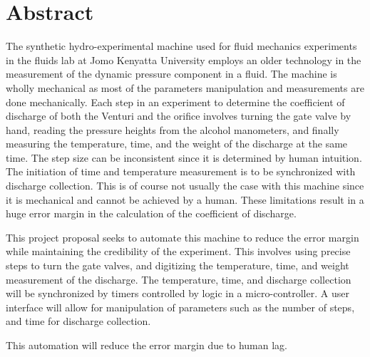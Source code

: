 \section*{Abstract}
\label{sec:}
The synthetic hydro-experimental machine used for fluid mechanics experiments in the fluids lab at Jomo Kenyatta University employs an older technology in the measurement of the dynamic pressure component in a fluid. The machine is wholly mechanical as most of the parameters manipulation and measurements are done mechanically. Each step in an experiment to determine the coefficient of discharge of both the Venturi and the orifice involves turning the gate valve by hand, reading the pressure heights from the alcohol manometers, and finally measuring the temperature, time, and the weight of the discharge at the same time. The step size can be inconsistent since it is determined by human intuition. The initiation of time and temperature measurement is to be synchronized with discharge collection. This is of course not usually the case with this machine since it is mechanical and cannot be achieved by a human. These limitations result in a huge error margin in the calculation of the coefficient of discharge.
\par
This project proposal seeks to automate this machine to reduce the error margin while maintaining the credibility of the experiment. This involves using precise steps to turn the gate valves, and digitizing the temperature, time, and weight measurement of the discharge. The temperature, time, and discharge collection will be synchronized by timers controlled by logic in a micro-controller. A user interface will allow for manipulation of parameters such as the number of steps, and time for discharge collection.
\par
This automation will reduce the error margin due to human lag.